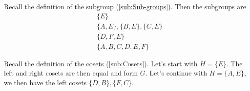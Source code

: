 Recall the definition of the subgroup (\autoref{sub:Sub-groups}). Then the
subgroups are
\begin{align*}
    &\{E\}\\
    &\{A,E\},\{B,E\},\{C,E\}\\
    &\{D,F,E\}\\
    &\{A,B,C,D,E,F\}
\end{align*}

Recall the definition of the cosets (\autoref{sub:Cosets}). Let's start with
$H=\{E\}$. The left and right cosets are then equal and form $G$. Let's continue
with $H=\{A,E\}$, we then have the left cosets $\{D,B\}, \{F,C\}$.

